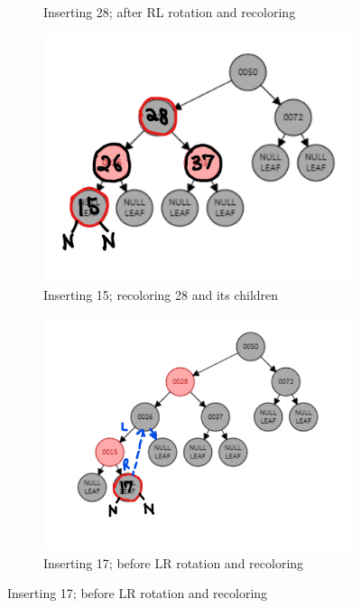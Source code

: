 \documentclass[12pt, a4paper]{article}
\begin{document}
\begin{enumerate}
\begin{figure}[h!]
\begin{subfigure}[b]{0.3\textwidth}
        \caption{Inserting 28; after RL rotation and recoloring}
        \label{fig:3-2-b}
      \end{subfigure}
      \hfill
      \begin{subfigure}[b]{0.3\textwidth}
        \centering
        \includegraphics[width=\textwidth]{3-2-c}
        \caption{Inserting 15; recoloring 28 and its children}
        \label{fig:3-2-c}
      \end{subfigure}
      \hfill
      \begin{subfigure}[b]{0.3\textwidth}
        \centering
        \includegraphics[width=\textwidth]{3-3-a}
        \caption{Inserting 17; before LR rotation and recoloring}

\end{subfigure}
\end{figure}
\end{enumerate}
\end{document}
